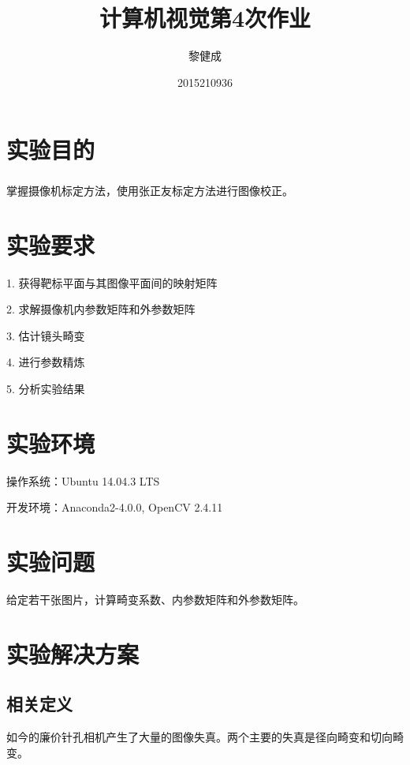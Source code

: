 \documentclass[a4paper, 12pt, UTF8]{article}
\begin{document}
\title{计算机视觉第4次作业}
\author{黎健成}
\date{2015210936}
\maketitle

\section{实验目的}

掌握摄像机标定方法，使用张正友标定方法\textsuperscript{\cite{ref1}}进行图像校正。


\section{实验要求}

1. 获得靶标平面与其图像平面间的映射矩阵

2. 求解摄像机内参数矩阵和外参数矩阵

3. 估计镜头畸变

4. 进行参数精炼

5. 分析实验结果

\section{实验环境}

操作系统：Ubuntu 14.04.3 LTS

开发环境：Anaconda2-4.0.0, OpenCV 2.4.11

\section{实验问题}

给定若干张图片，计算畸变系数、内参数矩阵和外参数矩阵。


\section{实验解决方案}


\subsection{相关定义}

如今的廉价针孔相机产生了大量的图像失真。两个主要的失真是径向畸变和切向畸变。
\end{document}
